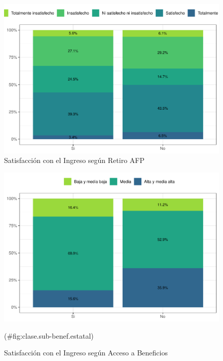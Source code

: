 \documentclass[
  12pt,
  openany]{book}
\begin{document}
\begin{figure}

{\centering \includegraphics{reporte-elsoc_files/figure-latex/satisfaccion-retiro-1} 

}

\caption{Satisfacción con el Ingreso según Retiro AFP}\label{fig:satisfaccion-retiro}
\end{figure}

\begin{figure}

{\centering \includegraphics{reporte-elsoc_files/figure-latex/clase.sub-benef.estatal-1} 

}

\caption{Satisfacción con el Ingreso según Acceso a Beneficios}(\#fig:clase.sub-benef.estatal)
\end{figure}
\end{document}

